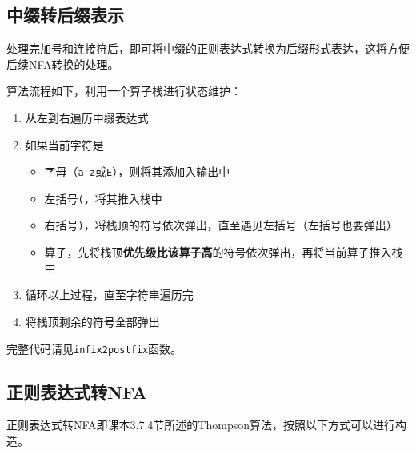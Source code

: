 \documentclass[logo,reportComp]{thesis}
\begin{document}
\subsection{中缀转后缀表示}
处理完加号和连接符后，即可将中缀的正则表达式转换为后缀形式表达，这将方便后续NFA转换的处理。

算法流程如下，利用一个算子栈进行状态维护：
\begin{enumerate}
	\item 从左到右遍历中缀表达式
	\item 如果当前字符是
	\begin{itemize}
		\item 字母（\verb'a-z'或\verb'E'），则将其添加入输出中
		\item 左括号\verb'('，将其推入栈中
		\item 右括号\verb')'，将栈顶的符号依次弹出，直至遇见左括号（左括号也要弹出）
		\item 算子，先将栈顶\textbf{优先级比该算子高}的符号依次弹出，再将当前算子推入栈中
	\end{itemize}
	\item 循环以上过程，直至字符串遍历完
	\item 将栈顶剩余的符号全部弹出
\end{enumerate}

完整代码请见\verb'infix2postfix'函数。

\subsection{正则表达式转NFA}
正则表达式转NFA即课本3.7.4节所述的Thompson算法，按照以下方式可以进行构造。
\end{document}
